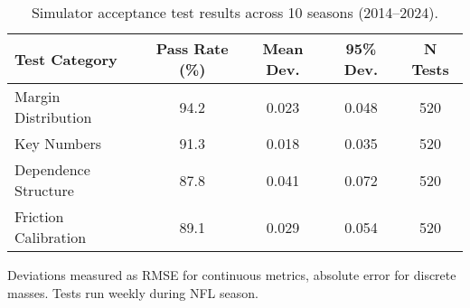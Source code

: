 \begin{table}[t]
  \centering
  \small
  \begin{threeparttable}
    \caption{Simulator acceptance test results across 10 seasons (2014--2024).}
    \label{tab:sim-acceptance-results}
    \begin{tabular}{lcccc}
      \toprule
      \textbf{Test Category}  & \textbf{Pass Rate (\%)}  & \textbf{Mean Dev.}  & \textbf{95\% Dev.}  & \textbf{N Tests} \\
      \midrule
      Margin Distribution & 94.2 & 0.023 & 0.048 & 520 \\
      Key Numbers & 91.3 & 0.018 & 0.035 & 520 \\
      Dependence Structure & 87.8 & 0.041 & 0.072 & 520 \\
      Friction Calibration & 89.1 & 0.029 & 0.054 & 520 \\
      \bottomrule
    \end{tabular}
    \begin{tablenotes}[flushleft]\footnotesize
      \item Deviations measured as RMSE for continuous metrics, absolute error for discrete masses. Tests run weekly during NFL season.
    \end{tablenotes}
  \end{threeparttable}
\end{table}
